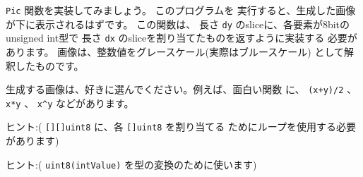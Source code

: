 \texttt{Pic} 関数を実装してみましょう。 このプログラムを
実行すると、生成した画像が下に表示されるはずです。 この関数は、
長さ \texttt{dy} のsliceに、各要素が8bitのunsigned int型で
長さ \texttt{dx} のsliceを割り当てたものを返すように実装する
必要があります。 画像は、整数値をグレースケール(実際はブルースケール)
として解釈したものです。

生成する画像は、好きに選んでください。例えば、面白い関数
に、 \texttt{(x+y)/2} 、 \texttt{x*y} 、 \texttt{x\^{}y} などがあります。

ヒント:( \texttt{[][]uint8} に、各 \texttt{[]uint8} を割り当てる
ためにループを使用する必要があります)

ヒント:( \texttt{uint8(intValue)} を型の変換のために使います)